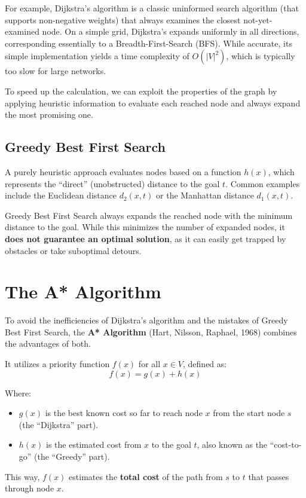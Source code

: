 \documentclass[a4paper, 11pt]{report}
\begin{document}
For example, Dijkstra's algorithm is a classic uninformed search algorithm (that supports non-negative weights) that always examines the closest not-yet-examined node. On a simple grid, Dijkstra's expands uniformly in all directions, corresponding essentially to a Breadth-First-Search (BFS). While accurate, its simple implementation yields a time complexity of $O(|V|^2)$, which is typically too slow for large networks.

To speed up the calculation, we can exploit the properties of the graph by applying heuristic information to evaluate each reached node and always expand the most promising one.

\subsection{Greedy Best First Search}
A purely heuristic approach evaluates nodes based on a function $h(x)$, which represents the ``direct'' (unobstructed) distance to the goal $t$. Common examples include the Euclidean distance $d_2(x,t)$ or the Manhattan distance $d_1(x,t)$. 

Greedy Best First Search always expands the reached node with the minimum distance to the goal. While this minimizes the number of expanded nodes, it \textbf{does not guarantee an optimal solution}, as it can easily get trapped by obstacles or take suboptimal detours.

\section{The A* Algorithm}

To avoid the inefficiencies of Dijkstra's algorithm and the mistakes of Greedy Best First Search, the \textbf{A* Algorithm} (Hart, Nilsson, Raphael, 1968) combines the advantages of both.

It utilizes a priority function $f(x)$ for all $x \in V$, defined as:
$$f(x) = g(x) + h(x)$$

Where:
\begin{itemize}
    \item $g(x)$ is the best known cost so far to reach node $x$ from the start node $s$ (the ``Dijkstra'' part).
    \item $h(x)$ is the estimated cost from $x$ to the goal $t$, also known as the ``cost-to-go'' (the ``Greedy'' part).
\end{itemize}

This way, $f(x)$ estimates the \textbf{total cost} of the path from $s$ to $t$ that passes through node $x$.
\end{document}
